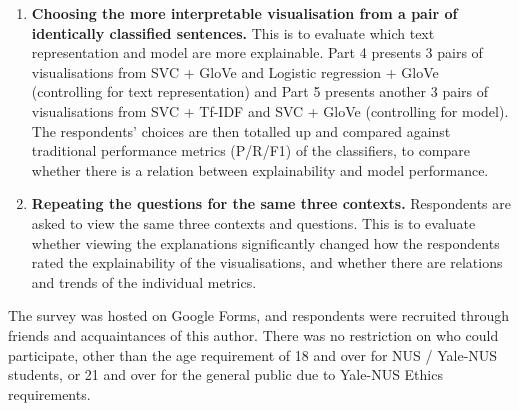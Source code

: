 \begin{enumerate}
	\item \textbf{Choosing the more interpretable visualisation from a pair of identically  classified sentences.} This is to evaluate which text representation and model are more explainable. Part 4 presents 3 pairs of visualisations from SVC + GloVe and Logistic regression + GloVe (controlling for text representation) and Part 5 presents another 3 pairs of visualisations from SVC + Tf-IDF and SVC + GloVe (controlling for model). The  respondents' choices are then totalled up and compared against traditional performance metrics (P/R/F1) of the classifiers, to compare whether there is a relation between explainability and model performance.
	\item \textbf{Repeating the questions for the same three contexts.} Respondents are asked to view the same three contexts and questions. This is to evaluate whether viewing the explanations significantly changed how the respondents rated the explainability of the visualisations, and whether there are relations and trends of the individual metrics.
\end{enumerate}

The survey was hosted on Google Forms, and respondents were recruited through friends and acquaintances of this author. There was no restriction on who could participate, other than the age requirement of 18 and over for NUS / Yale-NUS students, or 21 and over for the general public due to Yale-NUS Ethics requirements.
